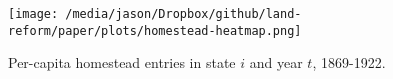 \documentclass[hidelinks,12pt]{article}
\begin{document}
\begin{appendices}

\begin{figure}[htbp]
	\begin{center}
		\texttt{[image: /media/jason/Dropbox/github/land-reform/paper/plots/homestead-heatmap.png]}
	\end{center}
	\caption{Per-capita homestead entries in state $i$ and year $t$, 1869-1922. \label{fig:homestead-heatmap}}
\end{figure}

\end{appendices}

\itemize
\end{document}

